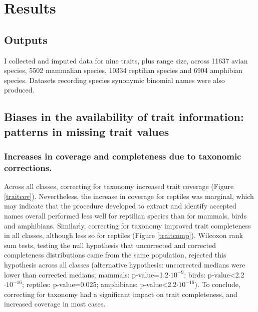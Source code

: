 \section{Results}

\subsection{Outputs}
I collected and imputed data for nine traits, plus range size, across 11637 avian species, 5502 mammalian species, 10334 reptilian species and 6904 amphibian species. Datasets recording species synonymic binomial names were also produced. 

\subsection{Biases in the availability of trait information: patterns in missing trait values}

\subsubsection{Increases in coverage and completeness due to taxonomic corrections.} 
Across all classes, correcting for taxonomy increased trait coverage (Figure \ref{traitcov}). Nevertheless, the increase in coverage for reptiles was marginal, which may indicate that the procedure developed to extract and identify accepted names overall performed less well for reptilian species than for mammals, birds and amphibians. Similarly, correcting for taxonomy improved trait completeness in all classes, although less so for reptiles (Figure \ref{traitcomp}). Wilcoxon rank sum tests, testing the null hypothesis that uncorrected and corrected completeness distributions came from the same population, rejected this hypothesis across all classes (alternative hypothesis: uncorrected medians were lower than corrected medians; mammals: p-value=1.2$\cdot10^{-9}$; birds: p-value<2.2$\cdot10^{-16}$; reptiles: p-value=0.025; amphibians: p-value<2.2$\cdot10^{-16}$). To conclude, correcting for taxonomy had a significant impact on trait completeness, and increased coverage in most cases. 


